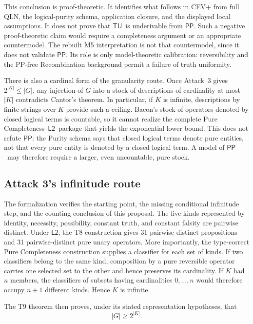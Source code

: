 \documentclass[12pt,leqno]{article}
\theoremstyle{plain}
\theoremstyle{definition}
\newcommand{\PP}{\ensuremath{\mathsf{PP}}}
\newcommand{\Ltwo}{\ensuremath{\mathsf{L2}}}
\newcommand{\TU}{\ensuremath{\mathsf{TU}}}
\begin{document}
This conclusion is proof-theoretic.  It identifies what follows in CEV+ from
full QLN, the logical-purity schema, application closure, and the displayed
local assumptions.  It does not prove that \TU\ is underivable from \PP.
Such a negative proof-theoretic
claim would require a completeness argument or an appropriate countermodel.
The rebuilt M5 interpretation is not that countermodel, since it does not
validate \PP.  Its role is only model-theoretic calibration: reversibility and
the PP-free Recombination background permit a failure of truth uniformity.

There is also a cardinal form of the granularity route.  Once Attack~3 gives
\(2^{|K|}\leq |G|\), any injection of \(G\) into a stock of descriptions of
cardinality at most \(|K|\) contradicts Cantor's theorem.  In particular, if
\(K\) is infinite, descriptions by finite strings over \(K\) provide such a
ceiling.  Bacon's stock of operators denoted by closed logical terms is
countable, so it cannot realize the complete Pure Completeness--\Ltwo\ package
that yields the exponential lower bound.  This does not refute \PP: the
Purity schema says that closed logical terms denote pure entities, not that
every pure entity is denoted by a closed logical term.  A model of \PP\ may
therefore require a larger, even uncountable, pure stock.

\subsection{Attack 3's infinitude route}

The formalization verifies the starting point, the missing conditional
infinitude step, and the counting conclusion of this proposal.  The five kinds
represented by identity, necessity, possibility, constant truth, and constant
falsity are pairwise distinct.  Under \Ltwo, the T8 construction gives 31
pairwise-distinct propositions and 31 pairwise-distinct pure unary operators.
More importantly, the type-correct Pure Completeness construction supplies a
classifier for each set of kinds.  If two classifiers belong to the same kind,
composition by a pure reversible operator carries one selected set to the
other and hence preserves its cardinality.  If \(K\) had \(n\) members, the
classifiers of subsets having cardinalities \(0,\ldots,n\) would therefore
occupy \(n+1\) different kinds.  Hence \(K\) is infinite.

The T9 theorem then proves, under its stated representation hypotheses, that
\[
 |G|\geq 2^{|K|}.
\]
\end{document}
